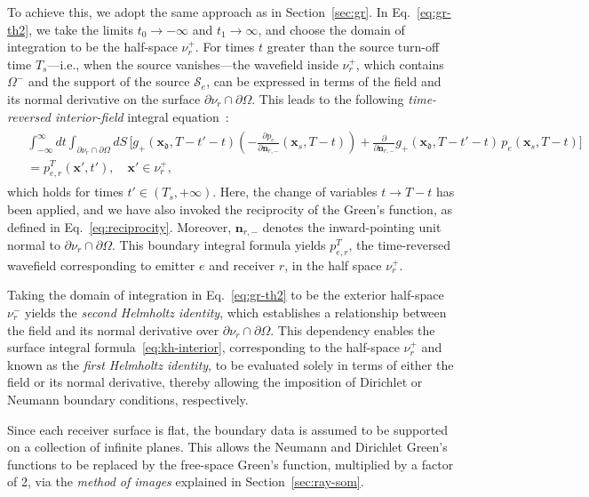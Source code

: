 \documentclass[11pt,reqno]{amsart}
\theoremstyle{remark}
\theoremstyle{italic_lemma}
\newcommand{\bx}{\boldsymbol{x}}
\newcommand{\bn}{\boldsymbol{n}}
\newcommand{\fd}{\mathfrak{d}}
\begin{document}
To achieve this, we adopt the same approach as in Section~\ref{sec:gr}. In Eq.~\eqref{eq:gr-th2}, we take the limits \( t_0 \to -\infty \) and \( t_1 \to \infty \), and choose the domain of integration to be the half-space \( \nu_r^+ \). For times \( t \) greater than the source turn-off time \( T_s \)—i.e., when the source vanishes—the wavefield inside \( \nu_r^+ \), which contains \( \Omega^- \) and the support of the source \( \mathcal{S}_e \), can be expressed in terms of the field and its normal derivative on the surface \( \partial \nu_r \cap \partial \Omega \). This leads to the following \textit{time-reversed interior-field} integral equation~\cite{Devaney}:
\begin{align} \label{eq:kh-interior}
\begin{split}
   & \int_{-\infty}^{\infty} dt \int_{\partial \nu_r \cap \partial \Omega} dS \, 
    \Bigg[ 
        g_+(\bx_{\fd}, T - t' - t) \left( - \frac{\partial p_e}{\partial \bn_{r,-}}(\bx_s, T - t) \right)
        + \frac{\partial}{\partial \bn_{r,-}} g_+(\bx_{\fd}, T - t' - t) \, p_e(\bx_s, T - t)  
    \Bigg]\\
   & =  p_{e,r}^T(\bx', t'), \quad \bx' \in \nu_r^+, 
\end{split}
\end{align}
which holds for times \( t' \in (T_s, +\infty) \). Here, the change of variables \( t \rightarrow T - t \) has been applied, and we have also invoked the reciprocity of the Green’s function, as defined in Eq.~\eqref{eq:reciprocity}. Moreover, \( \bn_{r,-} \) denotes the inward-pointing unit normal to \( \partial \nu_r \cap \partial \Omega \). This boundary integral formula yields \( p_{e,r}^T \), the time-reversed wavefield corresponding to emitter \( e \) and receiver \( r \), in the half space \(\nu_r^+\).


Taking the domain of integration in Eq.~\eqref{eq:gr-th2} to be the exterior half-space \( \nu_r^- \) yields the \textit{second Helmholtz identity}, which establishes a relationship between the field and its normal derivative over \( \partial \nu_r \cap \partial \Omega \). This dependency enables the surface integral formula~\eqref{eq:kh-interior}, corresponding to the half-space \( \nu_r^+ \) and known as the \textit{first Helmholtz identity}, to be evaluated solely in terms of either the field or its normal derivative, thereby allowing the imposition of Dirichlet or Neumann boundary conditions, respectively.

Since each receiver surface is flat, the boundary data is assumed to be supported on a collection of infinite planes. This allows the Neumann and Dirichlet Green's functions to be replaced by the free-space Green's function, multiplied by a factor of 2, via the \emph{method of images} explained in Section~\ref{sec:ray-som}.
\end{document}
